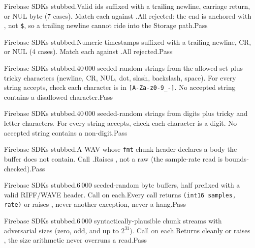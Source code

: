 {Firebase SDKs stubbed.}{Valid ids suffixed with a trailing newline, carriage return, or NUL byte (7 cases).}
{Match each against .}{All rejected: the end is anchored with \tn{\Z}, not \texttt{\$}, so a trailing newline cannot ride into the Storage path.}{Pass}

{Firebase SDKs stubbed.}{Numeric timestamps suffixed with a trailing newline, CR, or NUL (4 cases).}
{Match each against .}{All rejected.}{Pass}

{Firebase SDKs stubbed.}{40\,000 seeded-random strings from the allowed set plus tricky characters (newline, CR, NUL, dot, slash, backslash, space).}
{For every string  accepts, check each character is in \texttt{[A-Za-z0-9\_-]}.}
{No accepted string contains a disallowed character.}{Pass}

{Firebase SDKs stubbed.}{40\,000 seeded-random strings from digits plus tricky and letter characters.}
{For every string  accepts, check each character is a digit.}
{No accepted string contains a non-digit.}{Pass}

{Firebase SDKs stubbed.}{A WAV whose \texttt{fmt} chunk header declares a body the buffer does not contain.}
{Call .}{Raises , not a raw  (the sample-rate read is bounds-checked).}{Pass}

{Firebase SDKs stubbed.}{6\,000 seeded-random byte buffers, half prefixed with a valid RIFF/WAVE header.}
{Call  on each.}{Every call returns \texttt{(int16 samples, rate)} or raises  , never another exception, never a hang.}{Pass}

{Firebase SDKs stubbed.}{6\,000 syntactically-plausible chunk streams with adversarial sizes (zero, odd, and up to $2^{31}$).}
{Call  on each.}{Returns cleanly or raises  , the size arithmetic never overruns a read.}{Pass}

